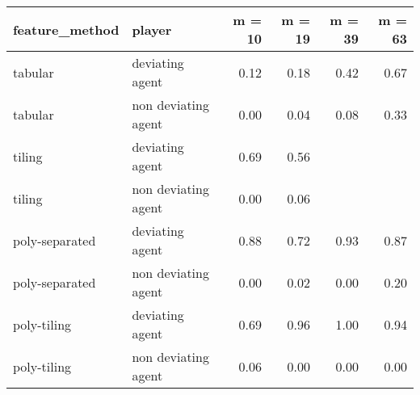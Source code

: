 \begin{tabular}{llrrrr}
  \hline
feature\_method & player & m = 10 & m = 19 & m = 39 & m = 63 \\ 
  \hline
tabular & deviating agent & 0.12 & 0.18 & 0.42 & 0.67 \\ 
  tabular & non deviating agent & 0.00 & 0.04 & 0.08 & 0.33 \\ 
  tiling & deviating agent & 0.69 & 0.56 &  &  \\ 
  tiling & non deviating agent & 0.00 & 0.06 &  &  \\ 
  poly-separated & deviating agent & 0.88 & 0.72 & 0.93 & 0.87 \\ 
  poly-separated & non deviating agent & 0.00 & 0.02 & 0.00 & 0.20 \\ 
  poly-tiling & deviating agent & 0.69 & 0.96 & 1.00 & 0.94 \\ 
  poly-tiling & non deviating agent & 0.06 & 0.00 & 0.00 & 0.00 \\ 
   \hline
\end{tabular}
